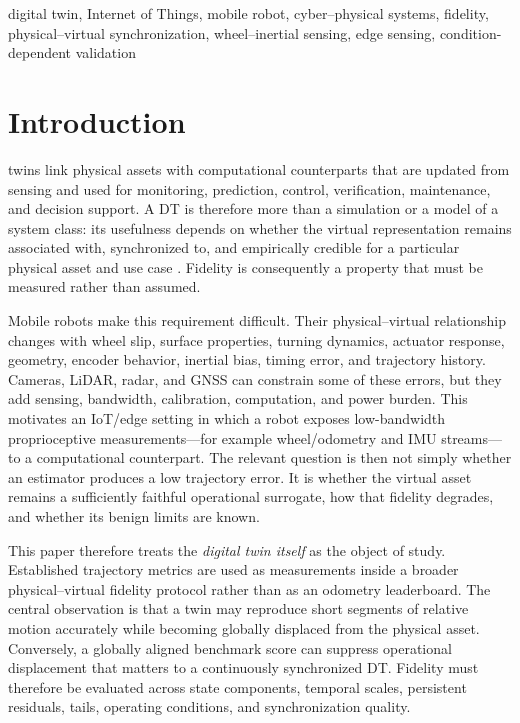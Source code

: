 \documentclass[journal]{IEEEtran}
\begin{document}
\begin{IEEEkeywords}
digital twin, Internet of Things, mobile robot, cyber--physical systems, fidelity, physical--virtual synchronization, wheel--inertial sensing, edge sensing, condition-dependent validation
\end{IEEEkeywords}

\section{Introduction}
 twins link physical assets with computational counterparts that are updated from sensing and used for monitoring, prediction, control, verification, maintenance, and decision support. A DT is therefore more than a simulation or a model of a system class: its usefulness depends on whether the virtual representation remains associated with, synchronized to, and empirically credible for a particular physical asset and use case \cite{dtc,jones2020,shao2023,nist8620}. Fidelity is consequently a property that must be measured rather than assumed.

Mobile robots make this requirement difficult. Their physical--virtual relationship changes with wheel slip, surface properties, turning dynamics, actuator response, geometry, encoder behavior, inertial bias, timing error, and trajectory history. Cameras, LiDAR, radar, and GNSS can constrain some of these errors, but they add sensing, bandwidth, calibration, computation, and power burden. This motivates an IoT/edge setting in which a robot exposes low-bandwidth proprioceptive measurements---for example wheel/odometry and IMU streams---to a computational counterpart. The relevant question is then not simply whether an estimator produces a low trajectory error. It is whether the virtual asset remains a sufficiently faithful operational surrogate, how that fidelity degrades, and whether its benign limits are known.

This paper therefore treats the \emph{digital twin itself} as the object of study. Established trajectory metrics are used as measurements inside a broader physical--virtual fidelity protocol rather than as an odometry leaderboard. The central observation is that a twin may reproduce short segments of relative motion accurately while becoming globally displaced from the physical asset. Conversely, a globally aligned benchmark score can suppress operational displacement that matters to a continuously synchronized DT. Fidelity must therefore be evaluated across state components, temporal scales, persistent residuals, tails, operating conditions, and synchronization quality.
\end{document}
